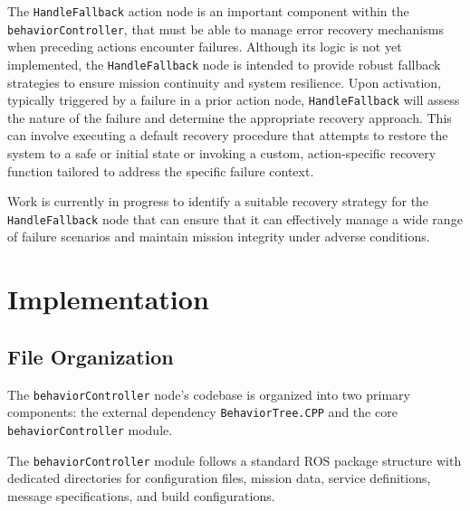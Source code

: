 \documentclass{CSSRforAfrica}
\begin{document}
The \texttt{\small HandleFallback} action node is an important component within the \\ \texttt{\small behaviorController}, that must be able to manage error recovery mechanisms when preceding actions encounter failures. Although its logic is not yet implemented, the \texttt{\small HandleFallback} node is intended to provide robust fallback strategies to ensure mission continuity and system resilience. Upon activation, typically triggered by a failure in a prior action node, \texttt{\small HandleFallback} will assess the nature of the failure and determine the appropriate recovery approach. This can involve executing a default recovery procedure that attempts to restore the system to a safe or initial state or invoking a custom, action-specific recovery function tailored to address the specific failure context. 

Work is currently in progress to identify a suitable recovery strategy for the \\ \texttt{\small HandleFallback} node that can ensure that it can effectively manage a wide range of failure scenarios and maintain mission integrity under adverse conditions.


\newpage
\section{Implementation}

\subsection{File Organization}
The \texttt{\small behaviorController} node's codebase is organized into two primary components: the external dependency \texttt{\small BehaviorTree.CPP} and the core \texttt{\small behaviorController} module. 

The \texttt{\small behaviorController} module follows a standard ROS package structure with dedicated directories for configuration files, mission data, service definitions, message specifications, and build configurations.
\end{document}
